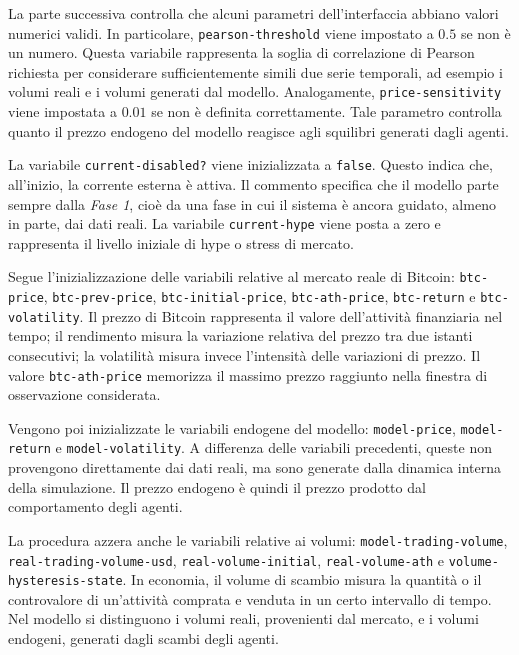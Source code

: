 La parte successiva controlla che alcuni parametri dell'interfaccia abbiano
valori numerici validi. In particolare, \texttt{pearson-threshold} viene impostato
a \(0.5\) se non è un numero. Questa variabile rappresenta la soglia di
correlazione di Pearson richiesta per considerare sufficientemente simili due
serie temporali, ad esempio i volumi reali e i volumi generati dal modello.
Analogamente, \texttt{price-sensitivity} viene impostata a \(0.01\) se non è
definita correttamente. Tale parametro controlla quanto il prezzo endogeno del
modello reagisce agli squilibri generati dagli agenti.

La variabile \texttt{current-disabled?} viene inizializzata a \texttt{false}.
Questo indica che, all'inizio, la corrente esterna è attiva. Il commento specifica
che il modello parte sempre dalla \emph{Fase 1}, cioè da una fase in cui il
sistema è ancora guidato, almeno in parte, dai dati reali. La variabile
\texttt{current-hype} viene posta a zero e rappresenta il livello iniziale di
hype o stress di mercato.

Segue l'inizializzazione delle variabili relative al mercato reale di Bitcoin:
\texttt{btc-price}, \texttt{btc-prev-price}, \texttt{btc-initial-price},
\texttt{btc-ath-price}, \texttt{btc-return} e \texttt{btc-volatility}. Il prezzo
di Bitcoin rappresenta il valore dell'attività finanziaria nel tempo; il
rendimento misura la variazione relativa del prezzo tra due istanti consecutivi;
la volatilità misura invece l'intensità delle variazioni di prezzo. Il valore
\texttt{btc-ath-price} memorizza il massimo prezzo raggiunto nella finestra di
osservazione considerata.

Vengono poi inizializzate le variabili endogene del modello:
\texttt{model-price}, \texttt{model-return} e \texttt{model-volatility}. A
differenza delle variabili precedenti, queste non provengono direttamente dai
dati reali, ma sono generate dalla dinamica interna della simulazione. Il prezzo
endogeno è quindi il prezzo prodotto dal comportamento degli agenti.

La procedura azzera anche le variabili relative ai volumi:
\texttt{model-trading-volume}, \texttt{real-trading-volume-usd},
\texttt{real-volume-initial}, \texttt{real-volume-ath} e
\texttt{volume-hysteresis-state}. In economia, il volume di scambio misura la
quantità o il controvalore di un'attività comprata e venduta in un certo
intervallo di tempo. Nel modello si distinguono i volumi reali, provenienti dal
mercato, e i volumi endogeni, generati dagli scambi degli agenti.

